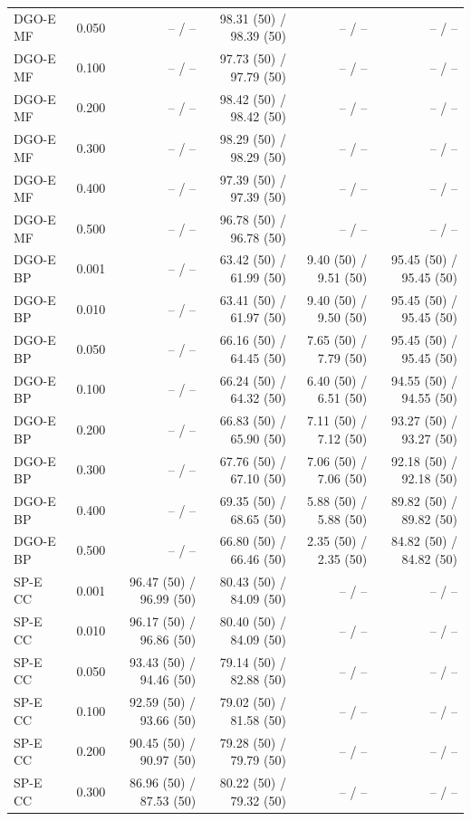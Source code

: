 \begin{longtable}{lrrrrr}
DGO-E MF & 0.050 & -- / -- & 98.31 (50) / 98.39 (50) & -- / -- & -- / -- \\
DGO-E MF & 0.100 & -- / -- & 97.73 (50) / 97.79 (50) & -- / -- & -- / -- \\
DGO-E MF & 0.200 & -- / -- & 98.42 (50) / 98.42 (50) & -- / -- & -- / -- \\
DGO-E MF & 0.300 & -- / -- & 98.29 (50) / 98.29 (50) & -- / -- & -- / -- \\
DGO-E MF & 0.400 & -- / -- & 97.39 (50) / 97.39 (50) & -- / -- & -- / -- \\
DGO-E MF & 0.500 & -- / -- & 96.78 (50) / 96.78 (50) & -- / -- & -- / -- \\
DGO-E BP & 0.001 & -- / -- & 63.42 (50) / 61.99 (50) & 9.40 (50) / 9.51 (50) & 95.45 (50) / 95.45 (50) \\
DGO-E BP & 0.010 & -- / -- & 63.41 (50) / 61.97 (50) & 9.40 (50) / 9.50 (50) & 95.45 (50) / 95.45 (50) \\
DGO-E BP & 0.050 & -- / -- & 66.16 (50) / 64.45 (50) & 7.65 (50) / 7.79 (50) & 95.45 (50) / 95.45 (50) \\
DGO-E BP & 0.100 & -- / -- & 66.24 (50) / 64.32 (50) & 6.40 (50) / 6.51 (50) & 94.55 (50) / 94.55 (50) \\
DGO-E BP & 0.200 & -- / -- & 66.83 (50) / 65.90 (50) & 7.11 (50) / 7.12 (50) & 93.27 (50) / 93.27 (50) \\
DGO-E BP & 0.300 & -- / -- & 67.76 (50) / 67.10 (50) & 7.06 (50) / 7.06 (50) & 92.18 (50) / 92.18 (50) \\
DGO-E BP & 0.400 & -- / -- & 69.35 (50) / 68.65 (50) & 5.88 (50) / 5.88 (50) & 89.82 (50) / 89.82 (50) \\
DGO-E BP & 0.500 & -- / -- & 66.80 (50) / 66.46 (50) & 2.35 (50) / 2.35 (50) & 84.82 (50) / 84.82 (50) \\
SP-E CC & 0.001 & 96.47 (50) / 96.99 (50) & 80.43 (50) / 84.09 (50) & -- / -- & -- / -- \\
SP-E CC & 0.010 & 96.17 (50) / 96.86 (50) & 80.40 (50) / 84.09 (50) & -- / -- & -- / -- \\
SP-E CC & 0.050 & 93.43 (50) / 94.46 (50) & 79.14 (50) / 82.88 (50) & -- / -- & -- / -- \\
SP-E CC & 0.100 & 92.59 (50) / 93.66 (50) & 79.02 (50) / 81.58 (50) & -- / -- & -- / -- \\
SP-E CC & 0.200 & 90.45 (50) / 90.97 (50) & 79.28 (50) / 79.79 (50) & -- / -- & -- / -- \\
SP-E CC & 0.300 & 86.96 (50) / 87.53 (50) & 80.22 (50) / 79.32 (50) & -- / -- & -- / -- \\

\end{longtable}
